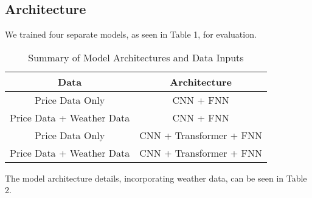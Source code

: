 \documentclass[12pt]{article}
\begin{document}
\subsection*{Architecture}

We trained four separate models, as seen in Table 1, for evaluation.
\begin{table}[h]
    \centering
    \begin{tabular}{c|c}
        \toprule
        \textbf{Data} & \textbf{Architecture} \\ 
        \midrule
        Price Data Only & CNN + FNN \\ 
        Price Data + Weather Data & CNN + FNN \\ 
        Price Data Only & CNN + Transformer + FNN \\ 
        Price Data + Weather Data & CNN + Transformer + FNN \\
        \bottomrule
    \end{tabular}
    \caption{Summary of Model Architectures and Data Inputs}
    \label{tab:arch_data_combo}
\end{table}

The model architecture details, incorporating weather data, can be seen in Table 2.
\end{document}

